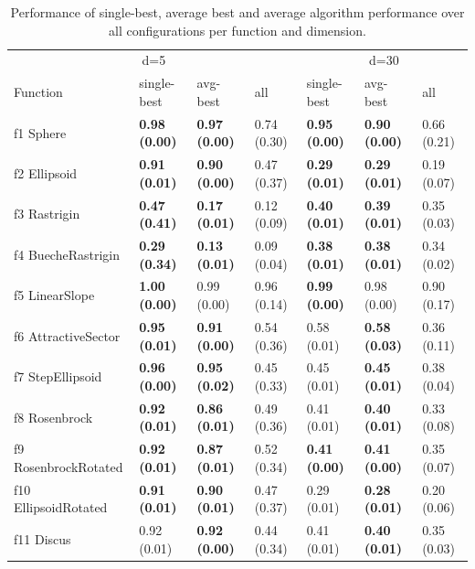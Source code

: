 \begin{table}
\caption{Performance of single-best, average best and average algorithm performance over all configurations per function and dimension.}
\begin{tabular}{lllllll}
\toprule
\multicolumn{4}{c}{d=5} & \multicolumn{3}{c}{d=30} \\
Function & single-best & avg-best & all & single-best & avg-best & all \\
\midrule
f1 Sphere & \textbf{0.98 (0.00)} & \textbf{0.97 (0.00)} & 0.74 (0.30) & \textbf{0.95 (0.00)} & \textbf{0.90 (0.00)} & 0.66 (0.21) \\
f2 Ellipsoid & \textbf{0.91 (0.01)} & \textbf{0.90 (0.00)} & 0.47 (0.37) & \textbf{0.29 (0.01)} & \textbf{0.29 (0.01)} & 0.19 (0.07) \\
f3 Rastrigin & \textbf{0.47 (0.41)} & \textbf{0.17 (0.01)} & 0.12 (0.09) & \textbf{0.40 (0.01)} & \textbf{0.39 (0.01)} & 0.35 (0.03) \\
f4 BuecheRastrigin & \textbf{0.29 (0.34)} & \textbf{0.13 (0.01)} & 0.09 (0.04) & \textbf{0.38 (0.01)} & \textbf{0.38 (0.01)} & 0.34 (0.02) \\
f5 LinearSlope & \textbf{1.00 (0.00)} & 0.99 (0.00) & 0.96 (0.14) & \textbf{0.99 (0.00)} & 0.98 (0.00) & 0.90 (0.17) \\
f6 AttractiveSector & \textbf{0.95 (0.01)} & \textbf{0.91 (0.00)} & 0.54 (0.36) & 0.58 (0.01) & \textbf{0.58 (0.03)} & 0.36 (0.11) \\
f7 StepEllipsoid & \textbf{0.96 (0.00)} & \textbf{0.95 (0.02)} & 0.45 (0.33) & 0.45 (0.01) & \textbf{0.45 (0.01)} & 0.38 (0.04) \\
f8 Rosenbrock & \textbf{0.92 (0.01)} & \textbf{0.86 (0.01)} & 0.49 (0.36) & 0.41 (0.01) & \textbf{0.40 (0.01)} & 0.33 (0.08) \\
f9 RosenbrockRotated & \textbf{0.92 (0.01)} & \textbf{0.87 (0.01)} & 0.52 (0.34) & \textbf{0.41 (0.00)} & \textbf{0.41 (0.00)} & 0.35 (0.07) \\
f10 EllipsoidRotated & \textbf{0.91 (0.01)} & \textbf{0.90 (0.01)} & 0.47 (0.37) & 0.29 (0.01) & \textbf{0.28 (0.01)} & 0.20 (0.06) \\
f11 Discus & 0.92 (0.01) & \textbf{0.92 (0.00)} & 0.44 (0.34) & 0.41 (0.01) & \textbf{0.40 (0.01)} & 0.35 (0.03) \\

\end{tabular}
\end{table}
